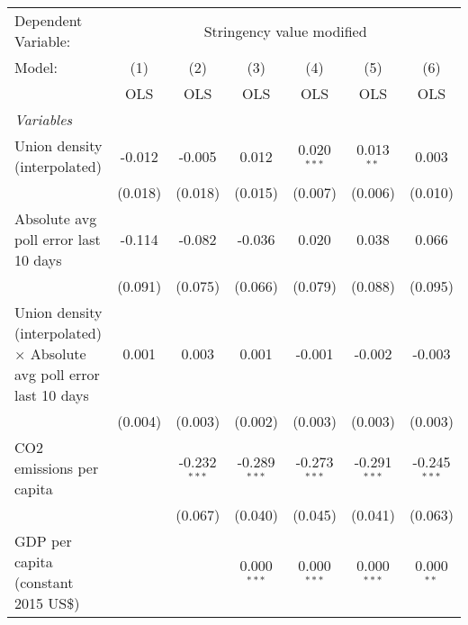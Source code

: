 
\begingroup
\centering
\begin{tabular}{lcccccc}
   \toprule
   Dependent Variable: & \multicolumn{6}{c}{Stringency value modified}\\
   Model:                                                                      & (1)     & (2)            & (3)            & (4)            & (5)            & (6)\\  
                                                                               &  OLS    & OLS            & OLS            & OLS            & OLS            & OLS\\  
   \midrule
   \emph{Variables}\\
   Union density (interpolated)                                                & -0.012  & -0.005         & 0.012          & 0.020$^{***}$  & 0.013$^{**}$   & 0.003\\   
                                                                               & (0.018) & (0.018)        & (0.015)        & (0.007)        & (0.006)        & (0.010)\\   
   Absolute avg poll error last 10 days                                        & -0.114  & -0.082         & -0.036         & 0.020          & 0.038          & 0.066\\   
                                                                               & (0.091) & (0.075)        & (0.066)        & (0.079)        & (0.088)        & (0.095)\\   
   Union density (interpolated) $\times$ Absolute avg poll error last 10 days  & 0.001   & 0.003          & 0.001          & -0.001         & -0.002         & -0.003\\   
                                                                               & (0.004) & (0.003)        & (0.002)        & (0.003)        & (0.003)        & (0.003)\\   
   CO2 emissions per capita                                                    &         & -0.232$^{***}$ & -0.289$^{***}$ & -0.273$^{***}$ & -0.291$^{***}$ & -0.245$^{***}$\\   
                                                                               &         & (0.067)        & (0.040)        & (0.045)        & (0.041)        & (0.063)\\   
   GDP per capita (constant 2015 US\$)                                         &         &                & 0.000$^{***}$  & 0.000$^{***}$  & 0.000$^{***}$  & 0.000$^{**}$\\   

\end{tabular}
